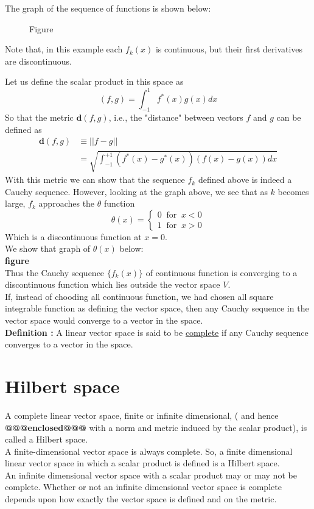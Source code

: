 The graph of the sequence of functions is shown below:

\begin{figure}
	\caption{Figure}
\end{figure}


Note that,  in this example each $f_k(x)$ is continuous, but their first derivatives are discontinuous.

Let us define the scalar product in this space as
\begin{equation}\label{eqn:2.92}
(f, g) = \int_{-1}^{1} f^*(x) g(x) dx
\end{equation}
So that the metric $\mathbf{d}(f, g)$, i.e., the "distance" between vectors $f$ and $g$ can be defined as
\begin{eqnarray}\label{eqn:2.93-2.94}
	\mathbf{d}(f, g) &\equiv ||f-g|| \\
	&= \sqrt{\int_{-1}^{+1}\left(f^*(x) - g^*(x)\right)\left(f(x) - g(x)\right) dx}
\end{eqnarray}
With this metric we can show that the sequence ${f_k}$ defined above is indeed a Cauchy sequence. However, looking at the graph above, we see that as $k$ becomes large, $f_k$ approaches the $\theta$ function
\begin{equation}\label{eqn:2.95}
\theta(x) = 
\begin{cases}
0 \ \text{ for } \ x < 0 \\
1 \ \text{ for } \ x > 0
\end{cases}
\end{equation}
Which is a discontinuous function at $x=0$.\\
We show that graph of $\theta(x)$ below:
\\
\textbf{figure}
\\
Thus the Cauchy sequence $\{f_k(x) \}$ of continuous function is converging to a discontinuous function which lies outside the vector space $V$.\\
If, instead of chooding all continuous function, we had chosen all square integrable function as defining the vector space, then any Cauchy sequence in the vector space would converge to a vector in the space.\\
\textbf{Definition : } A linear vector space is said to be \underline{complete} if any Cauchy sequence converges to a vector in the space.

\section{Hilbert space}
A complete linear vector space, finite or infinite dimensional, ( and hence \textbf{@@@enclosed@@@} with  a norm and metric induced by the scalar product), is called a Hilbert space.\\
A finite-dimensional vector space is always complete. So, a finite dimensional linear vector space in which a scalar product is defined is a Hilbert space.\\
An infinite dimensional vector space with a scalar product may or may not be complete. Whether or not an infinite dimensional vector space is complete depends upon how exactly the vector space is defined and on the metric.

